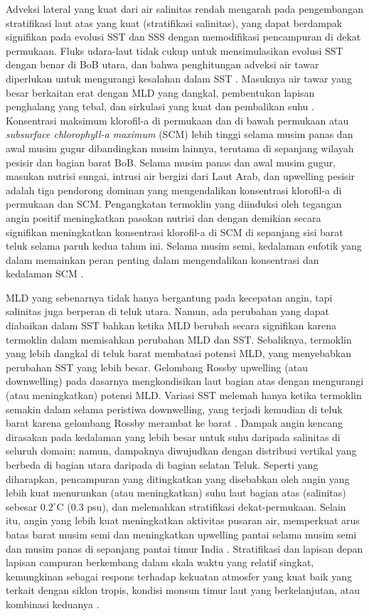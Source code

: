 \begin{spacing}{1.5}
	Adveksi lateral yang kuat dari air salinitas rendah mengarah pada pengembangan stratifikasi laut atas yang kuat (stratifikasi salinitas), yang dapat berdampak signifikan pada evolusi SST dan SSS dengan memodifikasi pencampuran di dekat permukaan. Fluks udara-laut tidak cukup untuk mensimulasikan evolusi SST dengan benar di BoB utara, dan bahwa penghitungan adveksi air tawar diperlukan untuk mengurangi kesalahan dalam SST . Masuknya air tawar yang besar berkaitan erat dengan MLD yang dangkal, pembentukan lapisan penghalang yang tebal, dan sirkulasi yang kuat dan pembalikan suhu . Konsentrasi maksimum klorofil-a di permukaan dan di bawah permukaan atau \textit{subsurface chlorophyll-a maximum} (SCM) lebih tinggi selama musim panas dan awal musim gugur dibandingkan musim lainnya, terutama di sepanjang wilayah pesisir dan bagian barat BoB. Selama musim panas dan awal musim gugur, masukan nutrisi sungai, intrusi air bergizi dari Laut Arab, dan upwelling pesisir adalah tiga pendorong dominan yang mengendalikan konsentrasi klorofil-a di permukaan dan SCM. Pengangkatan termoklin yang diinduksi oleh tegangan angin positif meningkatkan pasokan nutrisi dan dengan demikian secara signifikan meningkatkan konsentrasi klorofil-a di SCM di sepanjang sisi barat teluk selama paruh kedua tahun ini. Selama musim semi, kedalaman eufotik yang dalam memainkan peran penting dalam mengendalikan konsentrasi dan kedalaman SCM .
	
	MLD yang sebenarnya tidak hanya bergantung pada kecepatan angin, tapi salinitas juga berperan di teluk utara. Namun, ada perubahan yang dapat diabaikan dalam SST bahkan ketika MLD berubah secara signifikan karena termoklin dalam memisahkan perubahan MLD dan SST. Sebaliknya, termoklin yang lebih dangkal di teluk barat membatasi potensi MLD, yang menyebabkan perubahan SST yang lebih besar. Gelombang Rossby upwelling (atau downwelling) pada dasarnya mengkondisikan laut bagian atas dengan mengurangi (atau meningkatkan) potensi MLD. Variasi SST melemah hanya ketika termoklin semakin dalam selama peristiwa downwelling, yang terjadi kemudian di teluk barat karena gelombang Rossby merambat ke barat . Dampak angin kencang dirasakan pada kedalaman yang lebih besar untuk suhu daripada salinitas di seluruh domain; namun, dampaknya diwujudkan dengan distribusi vertikal yang berbeda di bagian utara daripada di bagian selatan Teluk. Seperti yang diharapkan, pencampuran yang ditingkatkan yang disebabkan oleh angin yang lebih kuat menurunkan (atau meningkatkan) suhu laut bagian atas (salinitas) sebesar $0.2^\circ$C (0.3 psu), dan melemahkan stratifikasi dekat-permukaan. Selain itu, angin yang lebih kuat meningkatkan aktivitas pusaran air, memperkuat arus batas barat musim semi dan meningkatkan upwelling pantai selama musim semi dan musim panas di sepanjang pantai timur India . Stratifikasi dan lapisan depan lapisan campuran berkembang dalam skala waktu yang relatif singkat, kemungkinan sebagai respons terhadap kekuatan atmosfer yang kuat baik yang terkait dengan siklon tropis, kondisi monsun timur laut yang berkelanjutan, atau kombinasi keduanya . 
	

\end{spacing}
